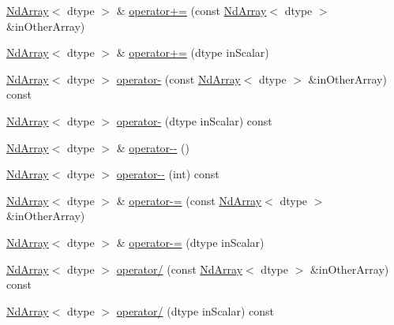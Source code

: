 \begin{DoxyCompactItemize}
\item 
\mbox{\hyperlink{class_num_c_1_1_nd_array}{Nd\+Array}}$<$ dtype $>$ \& \mbox{\hyperlink{class_num_c_1_1_nd_array_ada038e83835f7cdcb8173ab7e40a7805}{operator+=}} (const \mbox{\hyperlink{class_num_c_1_1_nd_array}{Nd\+Array}}$<$ dtype $>$ \&in\+Other\+Array)
\item 
\mbox{\hyperlink{class_num_c_1_1_nd_array}{Nd\+Array}}$<$ dtype $>$ \& \mbox{\hyperlink{class_num_c_1_1_nd_array_adf334fdf113d91cea91d7b8bf68b7291}{operator+=}} (dtype in\+Scalar)
\item 
\mbox{\hyperlink{class_num_c_1_1_nd_array}{Nd\+Array}}$<$ dtype $>$ \mbox{\hyperlink{class_num_c_1_1_nd_array_aa5625d7239485a21fd2cc59cec55dfb2}{operator-\/}} (const \mbox{\hyperlink{class_num_c_1_1_nd_array}{Nd\+Array}}$<$ dtype $>$ \&in\+Other\+Array) const
\item 
\mbox{\hyperlink{class_num_c_1_1_nd_array}{Nd\+Array}}$<$ dtype $>$ \mbox{\hyperlink{class_num_c_1_1_nd_array_a3a7f3f151033d72f08d1a0875e7f0c7f}{operator-\/}} (dtype in\+Scalar) const
\item 
\mbox{\hyperlink{class_num_c_1_1_nd_array}{Nd\+Array}}$<$ dtype $>$ \& \mbox{\hyperlink{class_num_c_1_1_nd_array_a3570e7df7c2202a6a8a5f5770f132ba3}{operator-\/-\/}} ()
\item 
\mbox{\hyperlink{class_num_c_1_1_nd_array}{Nd\+Array}}$<$ dtype $>$ \mbox{\hyperlink{class_num_c_1_1_nd_array_ae2cf6f24f8c46ac4b7409b09ecc69b0f}{operator-\/-\/}} (int) const
\item 
\mbox{\hyperlink{class_num_c_1_1_nd_array}{Nd\+Array}}$<$ dtype $>$ \& \mbox{\hyperlink{class_num_c_1_1_nd_array_a2ac18779cb518cfa4dcdff53065426e7}{operator-\/=}} (const \mbox{\hyperlink{class_num_c_1_1_nd_array}{Nd\+Array}}$<$ dtype $>$ \&in\+Other\+Array)
\item 
\mbox{\hyperlink{class_num_c_1_1_nd_array}{Nd\+Array}}$<$ dtype $>$ \& \mbox{\hyperlink{class_num_c_1_1_nd_array_a96520616f12f0a65f380aabd0e8a8e4e}{operator-\/=}} (dtype in\+Scalar)
\item 
\mbox{\hyperlink{class_num_c_1_1_nd_array}{Nd\+Array}}$<$ dtype $>$ \mbox{\hyperlink{class_num_c_1_1_nd_array_a931a3c3251279020beab2c1f198283a7}{operator/}} (const \mbox{\hyperlink{class_num_c_1_1_nd_array}{Nd\+Array}}$<$ dtype $>$ \&in\+Other\+Array) const
\item 
\mbox{\hyperlink{class_num_c_1_1_nd_array}{Nd\+Array}}$<$ dtype $>$ \mbox{\hyperlink{class_num_c_1_1_nd_array_ae650e8fc96a390cc8e1d159c45c5fd1a}{operator/}} (dtype in\+Scalar) const
\item 

\end{DoxyCompactItemize}
